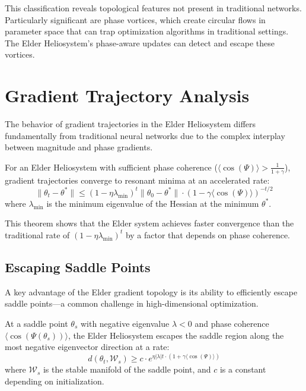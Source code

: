 This classification reveals topological features not present in traditional networks. Particularly significant are phase vortices, which create circular flows in parameter space that can trap optimization algorithms in traditional settings. The Elder Heliosystem's phase-aware updates can detect and escape these vortices.

\section{Gradient Trajectory Analysis}

The behavior of gradient trajectories in the Elder Heliosystem differs fundamentally from traditional neural networks due to the complex interplay between magnitude and phase gradients.

\begin{theorem}
For an Elder Heliosystem with sufficient phase coherence ($\langle\cos(\Psi)\rangle > \frac{1}{1+\gamma}$), gradient trajectories converge to resonant minima at an accelerated rate:
\begin{equation}
\|\theta_t - \theta^*\| \leq (1 - \eta \lambda_{\min})^t \|\theta_0 - \theta^*\| \cdot (1 - \gamma \langle\cos(\Psi)\rangle)^{-t/2}
\end{equation}
where $\lambda_{\min}$ is the minimum eigenvalue of the Hessian at the minimum $\theta^*$.
\end{theorem}

This theorem shows that the Elder system achieves faster convergence than the traditional rate of $(1 - \eta \lambda_{\min})^t$ by a factor that depends on phase coherence.

\subsection{Escaping Saddle Points}

A key advantage of the Elder gradient topology is its ability to efficiently escape saddle points—a common challenge in high-dimensional optimization.

\begin{theorem}
At a saddle point $\theta_s$ with negative eigenvalue $\lambda < 0$ and phase coherence $\langle\cos(\Psi(\theta_s))\rangle$, the Elder Heliosystem escapes the saddle region along the most negative eigenvector direction at a rate:
\begin{equation}
d(\theta_t, \mathcal{W}_s) \geq c \cdot e^{\eta |\lambda| t \cdot (1 + \gamma \langle\cos(\Psi)\rangle)}
\end{equation}
where $\mathcal{W}_s$ is the stable manifold of the saddle point, and $c$ is a constant depending on initialization.
\end{theorem}

